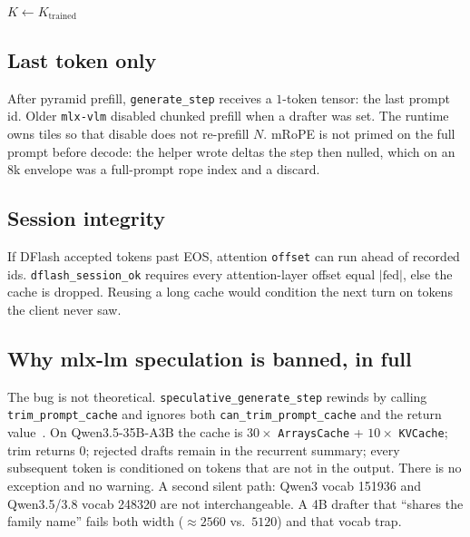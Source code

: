 \begin{algorithm}[t]
\caption{\texttt{\_arm\_draft\_block}: persist is not a speedup}
\begin{algorithmic}[1]
  \State $K \leftarrow K_{\mathrm{trained}}$ 
\EndIf
\end{algorithmic}
\end{algorithm}

\subsection{Last token only}

After pyramid prefill, \texttt{generate\_step} receives a $1$-token tensor: the last prompt id. Older \texttt{mlx-vlm} disabled chunked prefill when a drafter was set. The runtime owns tiles so that disable does not re-prefill $N$. mRoPE is not primed on the full prompt before decode: the helper wrote deltas the step then nulled, which on an 8k envelope was a full-prompt rope index and a discard.

\subsection{Session integrity}

If DFlash accepted tokens past EOS, attention \texttt{offset} can run ahead of recorded ids. \texttt{dflash\_session\_ok} requires every attention-layer offset equal $|\mathrm{fed}|$, else the cache is dropped. Reusing a long cache would condition the next turn on tokens the client never saw.

\subsection{Why mlx-lm speculation is banned, in full}

The bug is not theoretical. \texttt{speculative\_generate\_step} rewinds by calling \texttt{trim\_prompt\_cache} and ignores both \texttt{can\_trim\_prompt\_cache} and the return value~\citep{slotbankrepo}. On Qwen3.5-35B-A3B the cache is $30\times$ \texttt{ArraysCache} + $10\times$ \texttt{KVCache}; trim returns 0; rejected drafts remain in the recurrent summary; every subsequent token is conditioned on tokens that are not in the output. There is no exception and no warning. A second silent path: Qwen3 vocab 151936 and Qwen3.5/3.8 vocab 248320 are not interchangeable. A 4B drafter that ``shares the family name'' fails both width ($\approx 2560$ vs.\ $5120$) and that vocab trap.


